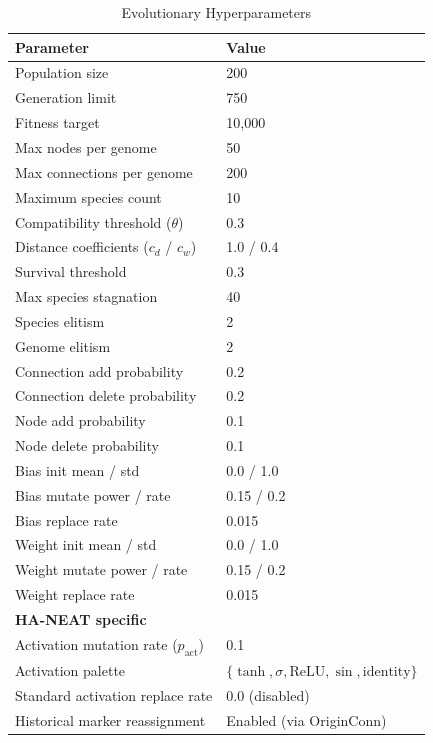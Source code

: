 \documentclass[12pt]{article}
\begin{document}
\begin{table}[h]
\centering
\caption{Evolutionary Hyperparameters}
\label{tab:hyperparameters}
\begin{tabular}{ll}
\toprule
\textbf{Parameter} & \textbf{Value} \\
\midrule
Population size & 200 \\
Generation limit & 750 \\
Fitness target & 10{,}000 \\
Max nodes per genome & 50 \\
Max connections per genome & 200 \\
Maximum species count & 10 \\
Compatibility threshold ($\theta$) & 0.3 \\
Distance coefficients ($c_d$ / $c_w$) & 1.0 / 0.4 \\
Survival threshold & 0.3 \\
Max species stagnation & 40 \\
Species elitism & 2 \\
Genome elitism & 2 \\
Connection add probability & 0.2 \\
Connection delete probability & 0.2 \\
Node add probability & 0.1 \\
Node delete probability & 0.1 \\
Bias init mean / std & 0.0 / 1.0 \\
Bias mutate power / rate & 0.15 / 0.2 \\
Bias replace rate & 0.015 \\
Weight init mean / std & 0.0 / 1.0 \\
Weight mutate power / rate & 0.15 / 0.2 \\
Weight replace rate & 0.015 \\
\midrule
\textbf{HA-NEAT specific} & \\
Activation mutation rate ($p_{\text{act}}$) & 0.1 \\
Activation palette & $\{\tanh, \sigma, \text{ReLU}, \sin, \text{identity}\}$ \\
Standard activation replace rate & 0.0 (disabled) \\
Historical marker reassignment & Enabled (via OriginConn) \\
\bottomrule
\end{tabular}
\end{table}
\end{document}
